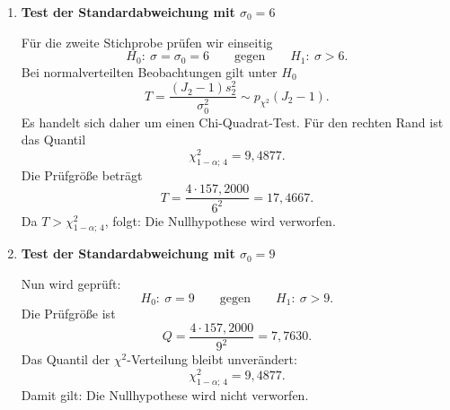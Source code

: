 \begin{enumerate}
\item[d)] \textbf{Test der Standardabweichung mit $\sigma_0=6$}

Für die zweite Stichprobe prüfen wir einseitig
\[
H_0:\ \sigma=\sigma_0=6
\qquad\text{gegen}\qquad
H_1:\ \sigma>6.
\]
Bei normalverteilten Beobachtungen gilt unter $H_0$
\[
T=\frac{(J_2-1)s_2^2}{\sigma_0^2}
\sim p_{\chi^2}(J_2-1).
\]
Es handelt sich daher um einen Chi-Quadrat-Test. Für den rechten Rand
ist das Quantil
\[
\chi^2_{1-\alpha;\,4}=9{,}4877.
\]
Die Prüfgröße beträgt
\[
T=\frac{4\cdot157{,}2000}{6^2}=17{,}4667.
\]
Da $T>\chi^2_{1-\alpha;\,4}$, folgt:
Die Nullhypothese wird verworfen.

\item[e)] \textbf{Test der Standardabweichung mit $\sigma_0=9$}

Nun wird geprüft:
\[
H_0:\ \sigma=9
\qquad\text{gegen}\qquad
H_1:\ \sigma>9.
\]
Die Prüfgröße ist
\[
Q=\frac{4\cdot157{,}2000}{9^2}=7{,}7630.
\]
Das Quantil der $\chi^2$-Verteilung bleibt unverändert:
\[
\chi^2_{1-\alpha;\,4}=9{,}4877.
\]
Damit gilt:
Die Nullhypothese wird nicht verworfen.

\end{enumerate}
